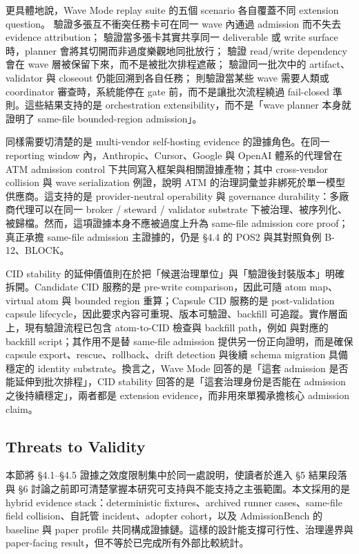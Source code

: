 \documentclass[a4paper,fontset=none]{ctexart}
\begin{document}
更具體地說，Wave Mode replay suite 的五個 scenario 各自覆蓋不同 extension question。\texttt{} 驗證多張互不衝突任務卡可在同一 wave 內通過 admission 而不失去 evidence attribution；\texttt{} 驗證當多張卡其實共享同一 deliverable 或 write surface 時，planner 會將其切開而非過度樂觀地同批放行；\texttt{} 驗證 read/write dependency 會在 wave 層被保留下來，而不是被批次排程遮蔽；\texttt{} 驗證同一批次中的 artifact、validator 與 closeout 仍能回溯到各自任務；\texttt{} 則驗證當某些 wave 需要人類或 coordinator 審查時，系統能停在 gate 前，而不是讓批次流程繞過 fail-closed 準則。這些結果支持的是 orchestration extensibility，而不是「wave planner 本身就證明了 same-file bounded-region admission」。

同樣需要切清楚的是 multi-vendor self-hosting evidence 的證據角色。在同一 reporting window 內，Anthropic、Cursor、Google 與 OpenAI 體系的代理曾在 ATM admission control 下共同寫入框架與相關證據產物；其中 cross-vendor collision 與 wave serialization 例證，說明 ATM 的治理詞彙並非綁死於單一模型供應商。這支持的是 provider-neutral operability 與 governance durability：多廠商代理可以在同一 broker / steward / validator substrate 下被治理、被序列化、被歸檔。然而，這項證據本身不應被過度上升為 same-file admission core proof；真正承擔 same-file admission 主證據的，仍是 §4.4 的 POS2 與其對照負例 B-12、BLOCK。

CID stability 的延伸價值則在於把「候選治理單位」與「驗證後封裝版本」明確拆開。Candidate CID 服務的是 pre-write comparison，因此可隨 atom map、virtual atom 與 bounded region 重算；Capsule CID 服務的是 post-validation capsule lifecycle，因此要求內容可重現、版本可驗證、backfill 可追蹤。實作層面上，現有驗證流程已包含 atom-to-CID 檢查與 backfill path，例如 \texttt{} 與對應的 backfill script；其作用不是替 same-file admission 提供另一份正向證明，而是確保 capsule export、rescue、rollback、drift detection 與後續 schema migration 具備穩定的 identity substrate。換言之，Wave Mode 回答的是「這套 admission 是否能延伸到批次排程」，CID stability 回答的是「這套治理身份是否能在 admission 之後持續穩定」，兩者都是 extension evidence，而非用來單獨承擔核心 admission claim。

\subsection{Threats to Validity}

本節將 §4.1--§4.5 證據之效度限制集中於同一處說明，使讀者於進入 §5 結果段落與 §6 討論之前即可清楚掌握本研究可支持與不能支持之主張範圍。本文採用的是 hybrid evidence stack：deterministic fixtures、archived runner cases、same-file field collision、自託管 incident、adopter cohort，以及 AdmissionBench 的 baseline 與 paper profile 共同構成證據鏈。這樣的設計能支撐可行性、治理邊界與 paper-facing result，但不等於已完成所有外部比較統計。
\end{document}
